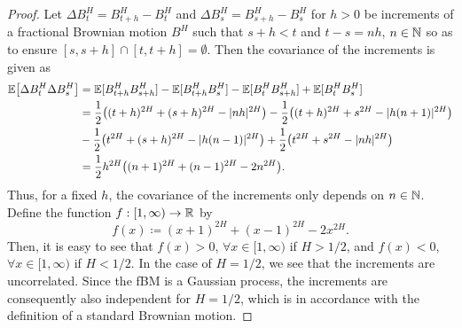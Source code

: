 \begin{proof}
Let $\Delta B_{t}^{H}=B_{t+h}^{H}-B_{t}^{H}$ and $\Delta B_{s}^{H}=B_{s+h}^{H}-B_{s}^{H}$ for $h>0$ be increments of a fractional Brownian motion $B^{H}$ such that $s+h< t$ and $t-s=nh$, $n\in \mathbb{N}$ so as to ensure $[s,s+h]\cap [t,t+h]=\emptyset$. Then the covariance of the increments is given as
\begin{align*}
    \E\left[\Delta B_{t}^{H}\Delta B_{s}^{H}\right]&=\E[B_{t+h}^{H}B_{s+h}^{H}]-\E[B_{t+h}^{H}B_{s}^{H}]-\E[B_{t}^{H}B_{s+h}^{H}]+\E[B_{t}^{H}B_{s}^{H}]\\
    &= \frac{1}{2}\left((t+h)^{2H}+(s+h)^{2H}-|nh|^{2H}\right)-\frac{1}{2}\left((t+h)^{2H}+s^{2H}-|h(n+1)|^{2H}\right)\\
    & -\frac{1}{2}\left(t^{2H}+(s+h)^{2H}-|h(n-1)|^{2H}\right)+ \frac{1}{2}\left(t^{2H}+s^{2H}-|nh|^{2H}\right)\\
    &=  \frac{1}{2}h^{2H}\left((n+1)^{2H}+(n-1)^{2H}-2n^{2H}\right).
\end{align*}
Thus, for a fixed $h$, the covariance of the increments only depends on $n\in \mathbb{N}$. Define the function $f:[1,\infty)\to \mathbb{R}$ by
\begin{equation}
f(x)\coloneqq (x+1)^{2H}+(x-1)^{2H}-2x^{2H}.
\end{equation}
Then, it is easy to see that $f(x)>0$, $\forall x\in [1,\infty)$ if $H>1/2$, and $f(x)<0$, $\forall x\in [1,\infty)$ if $H<1/2$. In the case of $H=1/2$, we see that the increments are uncorrelated. Since the fBM is a Gaussian process, the increments are consequently also independent for $H=1/2$, which is in accordance with the definition of a standard Brownian motion.
\end{proof}
